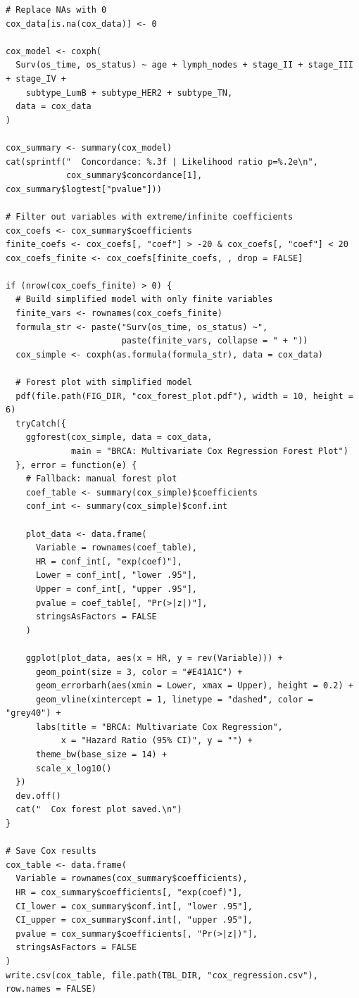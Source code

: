 \documentclass[12pt,a4paper]{ctexart}
\begin{document}
\begin{lstlisting}[caption={11_survival_analysis}, basicstyle=\ttfamily\scriptsize]
# Replace NAs with 0
cox_data[is.na(cox_data)] <- 0

cox_model <- coxph(
  Surv(os_time, os_status) ~ age + lymph_nodes + stage_II + stage_III + stage_IV +
    subtype_LumB + subtype_HER2 + subtype_TN,
  data = cox_data
)

cox_summary <- summary(cox_model)
cat(sprintf("  Concordance: %.3f | Likelihood ratio p=%.2e\n",
            cox_summary$concordance[1], cox_summary$logtest["pvalue"]))

# Filter out variables with extreme/infinite coefficients
cox_coefs <- cox_summary$coefficients
finite_coefs <- cox_coefs[, "coef"] > -20 & cox_coefs[, "coef"] < 20
cox_coefs_finite <- cox_coefs[finite_coefs, , drop = FALSE]

if (nrow(cox_coefs_finite) > 0) {
  # Build simplified model with only finite variables
  finite_vars <- rownames(cox_coefs_finite)
  formula_str <- paste("Surv(os_time, os_status) ~",
                       paste(finite_vars, collapse = " + "))
  cox_simple <- coxph(as.formula(formula_str), data = cox_data)

  # Forest plot with simplified model
  pdf(file.path(FIG_DIR, "cox_forest_plot.pdf"), width = 10, height = 6)
  tryCatch({
    ggforest(cox_simple, data = cox_data,
             main = "BRCA: Multivariate Cox Regression Forest Plot")
  }, error = function(e) {
    # Fallback: manual forest plot
    coef_table <- summary(cox_simple)$coefficients
    conf_int <- summary(cox_simple)$conf.int

    plot_data <- data.frame(
      Variable = rownames(coef_table),
      HR = conf_int[, "exp(coef)"],
      Lower = conf_int[, "lower .95"],
      Upper = conf_int[, "upper .95"],
      pvalue = coef_table[, "Pr(>|z|)"],
      stringsAsFactors = FALSE
    )

    ggplot(plot_data, aes(x = HR, y = rev(Variable))) +
      geom_point(size = 3, color = "#E41A1C") +
      geom_errorbarh(aes(xmin = Lower, xmax = Upper), height = 0.2) +
      geom_vline(xintercept = 1, linetype = "dashed", color = "grey40") +
      labs(title = "BRCA: Multivariate Cox Regression",
           x = "Hazard Ratio (95% CI)", y = "") +
      theme_bw(base_size = 14) +
      scale_x_log10()
  })
  dev.off()
  cat("  Cox forest plot saved.\n")
}

# Save Cox results
cox_table <- data.frame(
  Variable = rownames(cox_summary$coefficients),
  HR = cox_summary$coefficients[, "exp(coef)"],
  CI_lower = cox_summary$conf.int[, "lower .95"],
  CI_upper = cox_summary$conf.int[, "upper .95"],
  pvalue = cox_summary$coefficients[, "Pr(>|z|)"],
  stringsAsFactors = FALSE
)
write.csv(cox_table, file.path(TBL_DIR, "cox_regression.csv"), row.names = FALSE)


\end{lstlisting}
\end{document}
